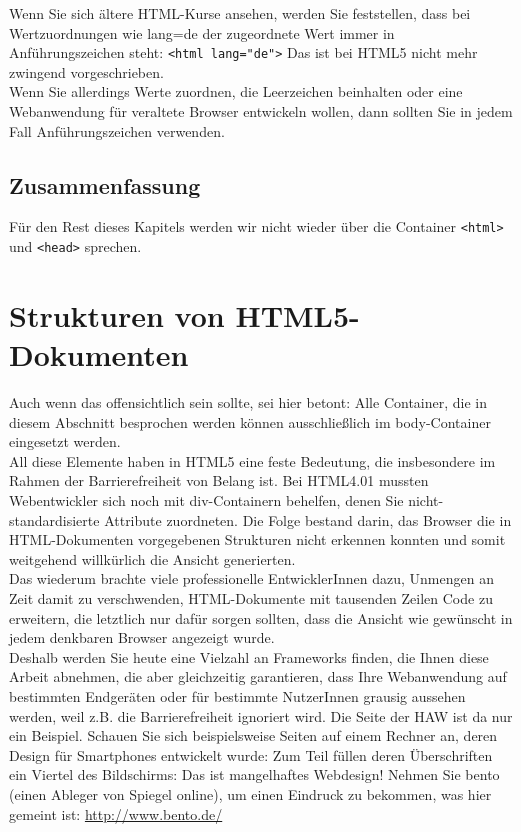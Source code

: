 Wenn Sie sich ältere HTML-Kurse ansehen, werden Sie feststellen, dass bei Wertzuordnungen wie lang=de der zugeordnete Wert immer in\\Anführungszeichen steht: \verb|<html lang="de">| Das ist bei HTML5 nicht mehr zwingend vorgeschrieben. \\

Wenn Sie allerdings Werte zuordnen, die Leerzeichen beinhalten oder eine Webanwendung für veraltete Browser entwickeln wollen, dann sollten Sie in jedem Fall Anführungszeichen verwenden.

\subsection{Zusammenfassung}

Für den Rest dieses Kapitels werden wir nicht wieder über die Container \verb|<html>| und \verb|<head>| sprechen.

\section{Strukturen von HTML5-Dokumenten}

Auch wenn das offensichtlich sein sollte, sei hier betont: Alle Container, die in diesem Abschnitt besprochen werden können ausschließlich im body-Container eingesetzt werden.\\

All diese Elemente haben in HTML5 eine feste Bedeutung, die insbesondere im Rahmen der Barrierefreiheit von Belang ist. Bei HTML4.01 mussten Webentwickler sich noch mit div-Containern behelfen, denen Sie nicht-standardisierte Attribute zuordneten. Die Folge bestand darin, das Browser die in HTML-Dokumenten vorgegebenen Strukturen nicht erkennen konnten und somit weitgehend willkürlich die Ansicht generierten.\\

Das wiederum brachte viele \glqq{}professionelle\grqq{} EntwicklerInnen dazu, Unmengen an Zeit damit zu verschwenden, HTML-Dokumente mit tausenden Zeilen Code zu erweitern, die letztlich nur dafür sorgen sollten, dass die Ansicht wie gewünscht in jedem denkbaren Browser angezeigt wurde.\\

Deshalb werden Sie heute eine Vielzahl an Frameworks finden, die Ihnen diese Arbeit abnehmen, die aber gleichzeitig garantieren, dass Ihre Webanwendung auf bestimmten Endgeräten oder für bestimmte NutzerInnen grausig aussehen werden, weil z.B. die Barrierefreiheit ignoriert wird. Die Seite der HAW ist da nur ein Beispiel. Schauen Sie sich beispielsweise Seiten auf einem Rechner an, deren Design für Smartphones entwickelt wurde: Zum Teil füllen deren Überschriften ein Viertel des Bildschirms: Das ist mangelhaftes Webdesign! Nehmen Sie bento (einen Ableger von Spiegel online), um einen Eindruck zu bekommen, was hier gemeint ist: \url{http://www.bento.de/}\\

